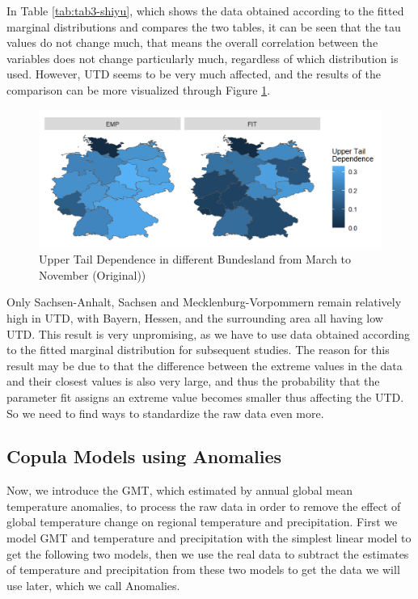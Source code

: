 \documentclass[
]{krantz}
\begin{document}
In Table \ref{tab:tab3-shiyu}, which shows the data obtained according to the fitted marginal distributions and compares the two tables, it can be seen that the tau values do not change much, that means the overall correlation between the variables does not change particularly much, regardless of which distribution is used. However, UTD seems to be very much affected, and the results of the comparison can be more visualized through Figure \ref{fig:utdmap1-shiyu}.

\begin{figure}

{\centering \includegraphics[width=0.8\linewidth]{work/03-compounds/figures/UTDMAP/original} 

}

\caption{Upper Tail Dependence in different Bundesland from March to November (Original))}\label{fig:utdmap1-shiyu}
\end{figure}

Only Sachsen-Anhalt, Sachsen and Mecklenburg-Vorpommern remain relatively high in UTD, with Bayern, Hessen, and the surrounding area all having low UTD. This result is very unpromising, as we have to use data obtained according to the fitted marginal distribution for subsequent studies. The reason for this result may be due to that the difference between the extreme values in the data and their closest values is also very large, and thus the probability that the parameter fit assigns an extreme value becomes smaller thus affecting the UTD. So we need to find ways to standardize the raw data even more.

\subsection{Copula Models using Anomalies}\label{anomaliesmodel-shiyu}

Now, we introduce the GMT, which estimated by annual global mean temperature anomalies, to process the raw data in order to remove the effect of global temperature change on regional temperature and precipitation. First we model GMT and temperature and precipitation with the simplest linear model to get the following two models, then we use the real data to subtract the estimates of temperature and precipitation from these two models to get the data we will use later, which we call Anomalies.
\end{document}
